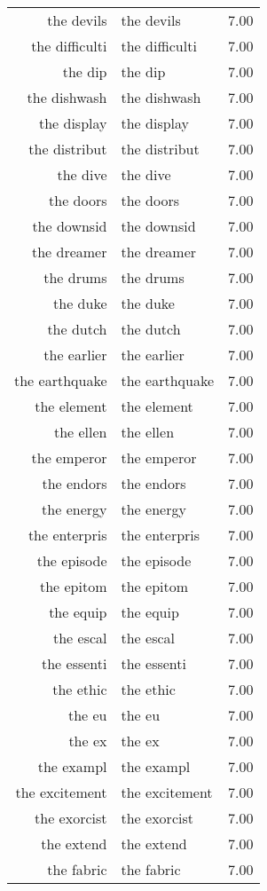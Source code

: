 \begin{table}[ht]
\begin{tabular}{rlr}
  the devils & the devils & 7.00 \\ 
  the difficulti & the difficulti & 7.00 \\ 
  the dip & the dip & 7.00 \\ 
  the dishwash & the dishwash & 7.00 \\ 
  the display & the display & 7.00 \\ 
  the distribut & the distribut & 7.00 \\ 
  the dive & the dive & 7.00 \\ 
  the doors & the doors & 7.00 \\ 
  the downsid & the downsid & 7.00 \\ 
  the dreamer & the dreamer & 7.00 \\ 
  the drums & the drums & 7.00 \\ 
  the duke & the duke & 7.00 \\ 
  the dutch & the dutch & 7.00 \\ 
  the earlier & the earlier & 7.00 \\ 
  the earthquake & the earthquake & 7.00 \\ 
  the element & the element & 7.00 \\ 
  the ellen & the ellen & 7.00 \\ 
  the emperor & the emperor & 7.00 \\ 
  the endors & the endors & 7.00 \\ 
  the energy & the energy & 7.00 \\ 
  the enterpris & the enterpris & 7.00 \\ 
  the episode & the episode & 7.00 \\ 
  the epitom & the epitom & 7.00 \\ 
  the equip & the equip & 7.00 \\ 
  the escal & the escal & 7.00 \\ 
  the essenti & the essenti & 7.00 \\ 
  the ethic & the ethic & 7.00 \\ 
  the eu & the eu & 7.00 \\ 
  the ex & the ex & 7.00 \\ 
  the exampl & the exampl & 7.00 \\ 
  the excitement & the excitement & 7.00 \\ 
  the exorcist & the exorcist & 7.00 \\ 
  the extend & the extend & 7.00 \\ 
  the fabric & the fabric & 7.00 \\ 

\end{tabular}
\end{table}
